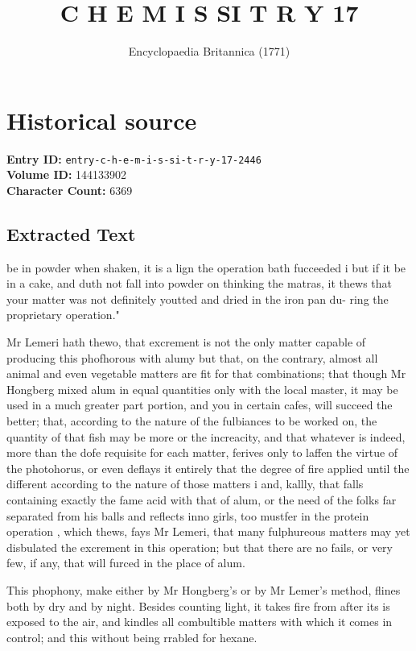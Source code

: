 \documentclass{article}
\title{C H E M I S SI T R Y 17}
\date{Encyclopaedia Britannica (1771)}
\begin{document}
\maketitle

\section*{Historical source}
\textbf{Entry ID:} \texttt{entry-c-h-e-m-i-s-si-t-r-y-17-2446} \\
\textbf{Volume ID:} 144133902 \\
\textbf{Character Count:} 6369

\subsection*{Extracted Text}
be in powder when shaken, it is a lign the operation bath fucceeded i but if it be in a cake, and duth not fall into powder on thinking the matras, it thews that your matter was not definitely youtted and dried in the iron pan du- ring the proprietary operation."

Mr Lemeri hath thewo, that excrement is not the only matter capable of producing this phofhorous with alumy but that, on the contrary, almost all animal and even vegetable matters are fit for that combinations; that though Mr Hongberg mixed alum in equal quantities only with the local master, it may be used in a much greater part portion, and you in certain cafes, will succeed the better; that, according to the nature of the fulbiances to be worked on, the quantity of that fish may be more or the increacity, and that whatever is indeed, more than the dofe requisite for each matter, ferives only to laffen the virtue of the photohorus, or even deflays it entirely that the degree of fire applied until the different according to the nature of those matters i and, kallly, that falls containing exactly the fame acid with that of alum, or the need of the folks far separated from his balls and reflects inno girls, too mustfer in the protein operation , which thews, fays Mr Lemeri, that many fulphureous matters may yet disbulated the excrement in this operation; but that there are no fails, or very few, if any, that will furced in the place of alum.

This phophony, make either by Mr Hongberg’s or by Mr Lemer’s method, flines both by dry and by night. Besides counting light, it takes fire from after its is exposed to the air, and kindles all combultible matters with which it comes in control; and this without being rrabled for hexane.
\end{document}
